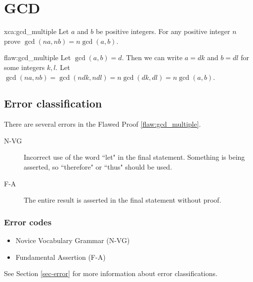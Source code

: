 \section{GCD}

\begin{xca}{xca:gcd_multiple}
Let $a$ and $b$ be positive integers. For any positive integer $n$ prove $\gcd(na, nb) = n\gcd(a,b)$. 
\end{xca}

\begin{flaw}{flaw:gcd_multiple} 
Let $\gcd(a,b) = d$. Then we can write $a = dk$ and $b = dl$ for some integers $k,l$. Let $\gcd(na, nb) = \gcd(ndk, ndl) = n\gcd(dk, dl) = n\gcd(a,b)$. 

\end{flaw}

\clearpage
\subsection{Error classification}



There are several errors
 in the Flawed Proof \ref{flaw:gcd_multiple}. 
 
 \begin{description}
    \item[N-VG] Incorrect use of the word ``let" in the final statement. Something is being asserted, so  ``therefore" or ``thus" should be used. 
    \item[F-A ] The entire result is asserted in the final statement without proof. 
 	
 \end{description}

 
\subsubsection{Error codes}
\begin{itemize}
	\item Novice Vocabulary Grammar (N-VG)
	\item Fundamental Assertion (F-A)
\end{itemize}
See Section \ref{sec-error} for more information about error classifications.

